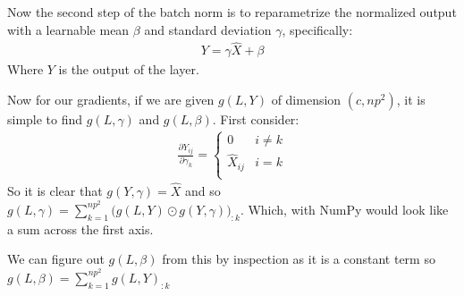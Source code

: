 \documentclass[12pt]{article}
\begin{document}
Now the second step of the batch norm is to reparametrize the normalized output
with a learnable mean $\beta$ and standard deviation $\gamma$, specifically:
\begin{align*}
    Y = \gamma \hat{X} + \beta
\end{align*}
Where $Y$ is the output of the layer.


Now for our gradients, if we are given $g(L, Y)$ of dimension $(c, np^2)$, it is simple to find
$g(L, \gamma)$ and $g(L, \beta)$. First consider:
\begin{align*}
    \frac{\partial Y_{ij}}{\partial \gamma_k} = 
    \begin{cases}
        0 & i \neq k \\
        \hat{X}_{ij} & i = k \\
    \end{cases}
\end{align*}
So it is clear that $g(Y, \gamma) = \hat{X}$ and so $g(L, \gamma) = \displaystyle \sum_{k = 1}^{np^2} \Big(g(L, Y) \odot g(Y, \gamma)\Big)_{:k}$.
Which, with NumPy would look like a sum across the first axis.


We can figure out $g(L, \beta)$ from this by inspection as it is a constant term so
$g(L, \beta) = \displaystyle \sum_{k = 1}^{np^2}g(L, Y)_{:k}$
\end{document}
